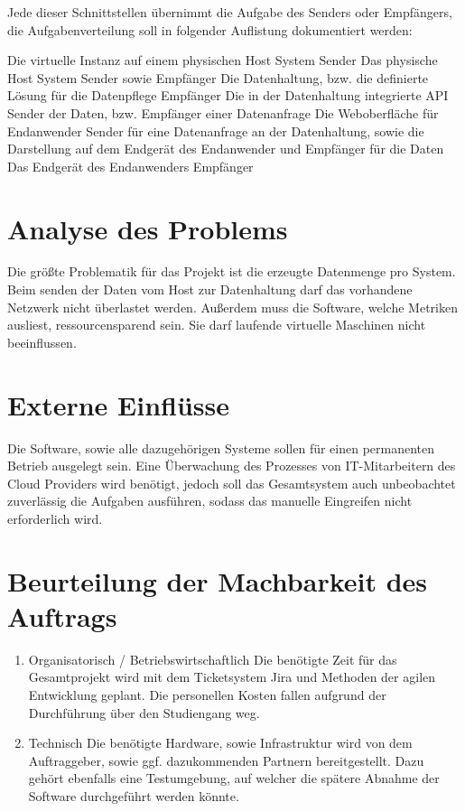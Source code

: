 Jede dieser Schnittstellen übernimmt die Aufgabe des Senders oder Empfängers,
die Aufgabenverteilung soll in folgender Auflistung dokumentiert werden:
\begin{outline}
  \1 Die virtuelle Instanz auf einem physischen Host System
    \2 Sender
  \1 Das physische Host System
    \2 Sender sowie Empfänger
  \1 Die Datenhaltung, bzw. die definierte Lösung für die Datenpflege
    \2 Empfänger
  \1 Die in der Datenhaltung integrierte API
    \2 Sender der Daten, bzw. Empfänger einer Datenanfrage
  \1 Die Weboberfläche für Endanwender
    \2 Sender für eine Datenanfrage an der Datenhaltung, sowie die Darstellung
    auf dem Endgerät des Endanwender und Empfänger für die Daten
  \1 Das Endgerät des Endanwenders
    \2 Empfänger
\end{outline}

\section{Analyse des Problems}

Die größte Problematik für das Projekt ist die erzeugte Datenmenge pro System.
Beim senden der Daten vom Host zur Datenhaltung darf das vorhandene Netzwerk
nicht überlastet werden. Außerdem muss die Software, welche Metriken ausliest,
ressourcensparend sein. Sie darf laufende virtuelle Maschinen nicht
beeinflussen.

\section{Externe Einflüsse}

Die Software, sowie alle dazugehörigen Systeme sollen für einen permanenten
Betrieb ausgelegt sein. Eine Überwachung des Prozesses von IT-Mitarbeitern des
Cloud Providers wird benötigt, jedoch soll das Gesamtsystem auch unbeobachtet
zuverlässig die Aufgaben ausführen, sodass das manuelle Eingreifen nicht
erforderlich wird.

\section{Beurteilung der Machbarkeit des Auftrags}

\begin{enumerate}
  \item Organisatorisch / Betriebswirtschaftlich
        Die benötigte Zeit für das Gesamtprojekt wird mit dem Ticketsystem Jira
        und Methoden der agilen Entwicklung geplant. Die personellen Kosten
        fallen aufgrund der Durchführung über den Studiengang weg.

  \item Technisch
        Die benötigte Hardware, sowie Infrastruktur wird von dem Auftraggeber,
        sowie ggf. dazukommenden Partnern bereitgestellt. Dazu gehört ebenfalls
        eine Testumgebung, auf welcher die spätere Abnahme der Software
        durchgeführt werden könnte.
\end{enumerate}

